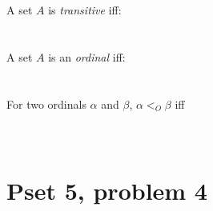 \documentclass[justified]{tufte-handout}
\begin{document}
\noindent A set $A$ is \emph{transitive} iff: \underline{\hspace{13.3cm}}\\\\\underline{\hspace{16.88cm}}\\

\noindent A set $A$ is an \emph{ordinal} iff: \underline{\hspace{13.2cm}}\\\\\underline{\hspace{16.88cm}}\\

\noindent For two ordinals $\alpha$ and $\beta$, $\alpha<_O\beta$ iff \underline{\hspace{11.2cm}}\\\\\underline{\hspace{16.88cm}}\\

\section{Pset 5, problem 4}
\end{document}

